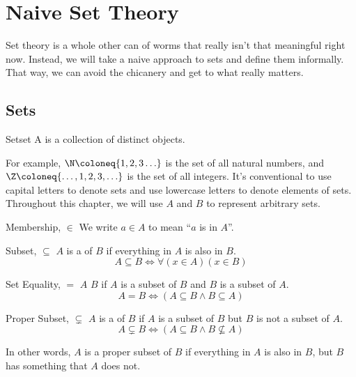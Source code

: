 \documentclass[12pt]{report}
\begin{document}
\chapter{Naive Set Theory}
Set theory is a whole other can of worms that really isn't that meaningful right now. Instead, we will take a naive approach to sets and define them informally. That way, we can avoid the chicanery and get to what really matters.

\section{Sets}
\begin{dfnbox}{Set}{set}
    A  is a collection of distinct objects.
\end{dfnbox}

For example, $\N \coloneq \{1,2,3\ldots\}$ is the set of all natural numbers, and $\Z \coloneq \{ \ldots, 1, 2, 3, \ldots\}$ is the set of all integers. It's conventional to use capital letters to denote sets and use lowercase letters to denote elements of sets. Throughout this
chapter, we will use $A$ and $B$ to represent arbitrary sets.

\begin{dfnbox}{Membership, $\in$}{}
    We write $a \in A$ to mean ``$a$ is in $A$''.
\end{dfnbox}

\begin{dfnbox}{Subset, $\subseteq$}{}
    $A$ is a  of $B$ if everything in $A$ is also in $B$.
    \tcblower
    \[ A \subseteq B \iff \forall(x \in A)(x \in B) \]
\end{dfnbox}

\begin{dfnbox}{Set Equality, $=$}{}
    $A$  $B$ if $A$ is a subset of $B$ and $B$ is a subset of $A$.
    \tcblower
    \[ A = B \iff (A \subseteq B \land B \subseteq A) \]
\end{dfnbox}

\begin{dfnbox}{Proper Subset, $\subsetneq$}{}
    $A$ is a  of $B$ if $A$ is a subset of $B$ but $B$ is not a subset of $A$.
    \tcblower
    \[ A \subsetneq B \iff (A \subseteq B \land B \not\subseteq A) \]
\end{dfnbox}

In other words, $A$ is a proper subset of $B$ if everything in $A$ is also in $B$, but $B$ has something that $A$ does not.
\end{document}
